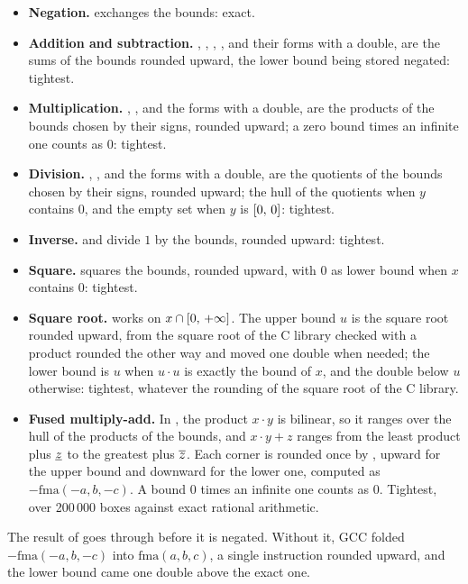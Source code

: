 \documentclass[12pt,a4paper,twoside,openright]{book}
\begin{document}
\begin{itemize}
\item[$\bullet$] \textbf{Negation.}  exchanges the bounds: exact.
\item[$\bullet$] \textbf{Addition and subtraction.} ,
  , \code{+=}, \code{-=}, and their forms with a double, are the
  sums of the bounds rounded upward, the lower bound being stored negated:
  tightest.
\item[$\bullet$] \textbf{Multiplication.} , \code{*=}, and the
  forms with a double, are the products of the bounds chosen by their signs,
  rounded upward; a zero bound times an infinite one counts as $0$:
  tightest.
\item[$\bullet$] \textbf{Division.} , \code{/=}, and the forms
  with a double, are the quotients of the bounds chosen by their signs,
  rounded upward; the hull of the quotients when $y$ contains $0$, and the
  empty set when $y$ is $[0,\,0]$: tightest.
\item[$\bullet$] \textbf{Inverse.}  and 
  divide $1$ by the bounds, rounded upward: tightest.
\item[$\bullet$] \textbf{Square.}  squares the bounds, rounded
  upward, with $0$ as lower bound when $x$ contains $0$: tightest.
\item[$\bullet$] \textbf{Square root.}  works on
  $x\cap[0,\,+\infty]$. The upper bound $u$ is the square root rounded
  upward, from the square root of the C library checked with a product
  rounded the other way and moved one double when needed; the lower bound
  is $u$ when $u\cdot u$ is exactly the bound of $x$, and the double below
  $u$ otherwise: tightest, whatever the rounding of the square root of the
  C library.
\item[$\bullet$] \textbf{Fused multiply-add.} In , the
  product $x\cdot y$ is bilinear, so it ranges over the hull of the
  products of the bounds, and $x\cdot y+z$ ranges from the least product
  plus $\underline{z}$ to the greatest plus $\overline{z}$. Each corner
  is rounded once by , upward for the upper bound and
  downward for the lower one, computed as $-\mathrm{fma}(-a, b, -c)$. A
  bound $0$ times an infinite one counts as $0$.\newinvfive{} Tightest,
  over 200\,000 boxes against exact rational arithmetic.
\end{itemize}

\begin{Rem}
The result of  goes through  before it is
negated. Without it, GCC folded $-\mathrm{fma}(-a, b, -c)$ into
$\mathrm{fma}(a, b, c)$, a single instruction rounded upward, and the lower
bound came one double above the exact one.
\end{Rem}
\end{document}
